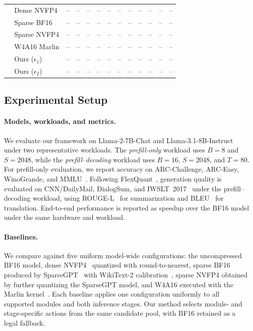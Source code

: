 \documentclass[letterpaper]{article} %
\begin{document}
\begin{table}[t]
{\begin{tabular}{llccccc|cccccc}
& Dense NVFP4         & -- & -- & -- & -- & --   & -- & -- & -- & --   & --   & -- \\
& Sparse BF16         & -- & -- & -- & -- & --   & -- & -- & -- & --   & --   & -- \\
& Sparse NVFP4        & -- & -- & -- & -- & --   & -- & -- & -- & --   & --   & -- \\
& W4A16 Marlin        & -- & -- & -- & -- & --   & -- & -- & -- & --   & --   & -- \\
& Ours ($\epsilon_1$) & -- & -- & -- & -- & --   & -- & -- & -- & --   & --   & -- \\
& Ours ($\epsilon_2$) & -- & -- & -- & -- & --   & -- & -- & -- & --   & --   & -- \\
\bottomrule
\end{tabular}}
\end{table}
\subsection{Experimental Setup}

\paragraph{Models, workloads, and metrics.}
We evaluate our framework on Llama-2-7B-Chat and Llama-3.1-8B-Instruct under two representative workloads. The \emph{prefill-only} workload uses $B=8$ and $S=2048$, while the \emph{prefill--decoding} workload uses $B=16$, $S=2048$, and $T=80$. For prefill-only evaluation, we report accuracy on ARC-Challenge, ARC-Easy, WinoGrande, and MMLU~\cite{clark2018arc,sakaguchi2020winogrande,hendrycks2021mmlu}. Following FlexQuant~\cite{liu2025flexquant}, generation quality is evaluated on CNN/DailyMail, DialogSum, and IWSLT~2017~\cite{nallapati2016cnndm,chen2021dialogsum,cettolo2017iwslt} under the prefill--decoding workload, using ROUGE-L~\cite{lin2004rouge} for summarization and BLEU~\cite{papineni2002bleu} for translation. End-to-end performance is reported as speedup over the BF16 model under the same hardware and workload.

\paragraph{Baselines.}
We compare against five uniform model-wide configurations: the uncompressed BF16 model, dense NVFP4~\cite{alvarez2025nvfp4} quantized with round-to-nearest, sparse BF16 produced by SparseGPT~\cite{frantar2023sparsegpt} with WikiText-2 calibration~\cite{merity2017wikitext}, sparse NVFP4 obtained by further quantizing the SparseGPT model, and W4A16 executed with the Marlin kernel~\cite{frantar2025marlin}. Each baseline applies one configuration uniformly to all supported modules and both inference stages. Our method selects module- and stage-specific actions from the same candidate pool, with BF16 retained as a legal fallback.
\end{document}
